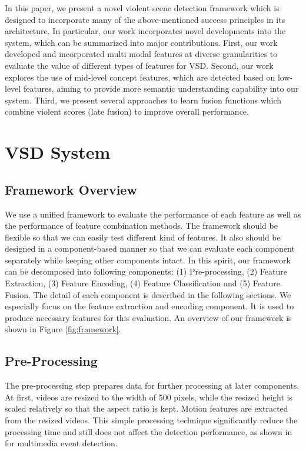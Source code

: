 \documentclass[twocolumn]{bmcart}%
\begin{document}
In this paper, we present a novel violent scene detection framework which is designed to incorporate many of the above-mentioned success principles in its architecture. In particular, our work incorporates novel developments into the system, which can be summarized into major contributions. First, our work developed and incorporated multi modal features at diverse granularities to evaluate the value of different types of features for VSD. Second, our work explores the use of mid-level concept features, which are detected based on low-level features, aiming to provide more semantic understanding capability into our system. Third, we present several approaches to learn fusion functions which combine violent scores (late fusion) to improve overall performance.
\section{VSD System}
\subsection{Framework Overview}

We use a unified framework to evaluate the performance of each feature as well as the performance of feature combination methods. The framework should be flexible so that we can easily test different kind of features. It also should be designed in a component-based manner so that we can evaluate each component separately while keeping other components intact. In this spirit, our framework can be decomposed into following components: (1) Pre-processing, (2) Feature Extraction, (3) Feature Encoding, (4) Feature Classification and (5) Feature Fusion. The detail of each component is described in the following sections. We especially focus on the feature extraction and encoding component. It is used to produce necessary features for this evaluation. An overview of our framework is shown in Figure \ref{fig:framework}.
\subsection{Pre-Processing}

The pre-processing step prepares data for further processing at later components. At first, videos are resized to the width of 500 pixels, while the resized height is scaled relatively so that the aspect ratio is kept. Motion features are extracted from the resized videos. This simple processing technique significantly reduce the processing time and still does not affect the detection performance, as shown in \cite{aly2013axes} for multimedia event detection.
\end{document}
